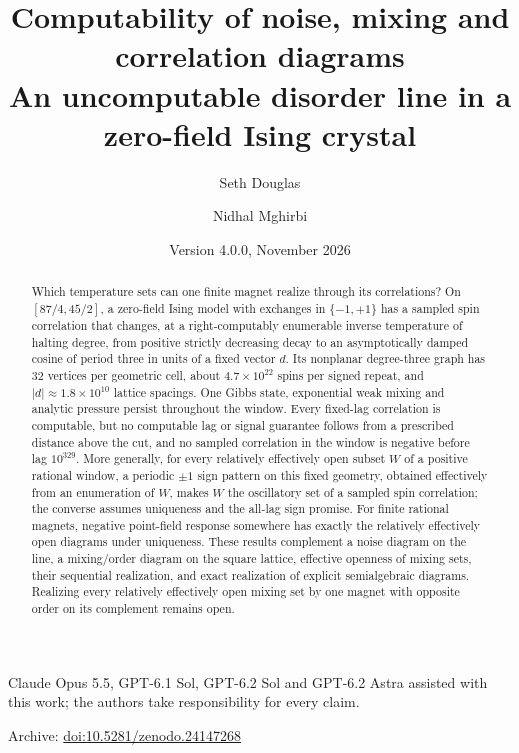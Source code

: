 \documentclass[11pt,a4paper]{article}
\title{\vspace{-1.2cm}\LARGE Computability of noise, mixing and correlation diagrams\\[0.4em]\Large An uncomputable disorder line in a zero-field Ising crystal}
\author{Seth Douglas \and Nidhal Mghirbi}
\date{\small Version 4.0.0, November 2026}
\theoremstyle{definition}
\begin{document}
\maketitle
\begin{center}
\small Claude Opus 5.5, GPT-6.1 Sol, GPT-6.2 Sol and GPT-6.2 Astra assisted with this work; the authors take responsibility for every claim.
\end{center}
\begin{center}
\small Archive: \href{https://doi.org/10.5281/zenodo.24147268}{doi:10.5281/zenodo.24147268}
\end{center}
\begin{abstract}
Which temperature sets can one finite magnet realize through its correlations? On \([87/4,45/2]\), a zero-field Ising model with exchanges in \(\{-1,+1\}\) has a sampled spin correlation that changes, at a right-computably enumerable inverse temperature of halting degree, from positive strictly decreasing decay to an asymptotically damped cosine of period three in units of a fixed vector \(d\). Its nonplanar degree-three graph has 32 vertices per geometric cell, about \(4.7\times10^{22}\) spins per signed repeat, and \(|d|\approx1.8\times10^{10}\) lattice spacings. One Gibbs state, exponential weak mixing and analytic pressure persist throughout the window. Every fixed-lag correlation is computable, but no computable lag or signal guarantee follows from a prescribed distance above the cut, and no sampled correlation in the window is negative before lag \(10^{329}\). More generally, for every relatively effectively open subset \(W\) of a positive rational window, a periodic \(\pm1\) sign pattern on this fixed geometry, obtained effectively from an enumeration of \(W\), makes \(W\) the oscillatory set of a sampled spin correlation; the converse assumes uniqueness and the all-lag sign promise. For finite rational magnets, negative point-field response somewhere has exactly the relatively effectively open diagrams under uniqueness. These results complement a noise diagram on the line, a mixing/order diagram on the square lattice, effective openness of mixing sets, their sequential realization, and exact realization of explicit semialgebraic diagrams. Realizing every relatively effectively open mixing set by one magnet with opposite order on its complement remains open.
\end{abstract}
{\small\tableofcontents}
















\appendix



\end{document}
